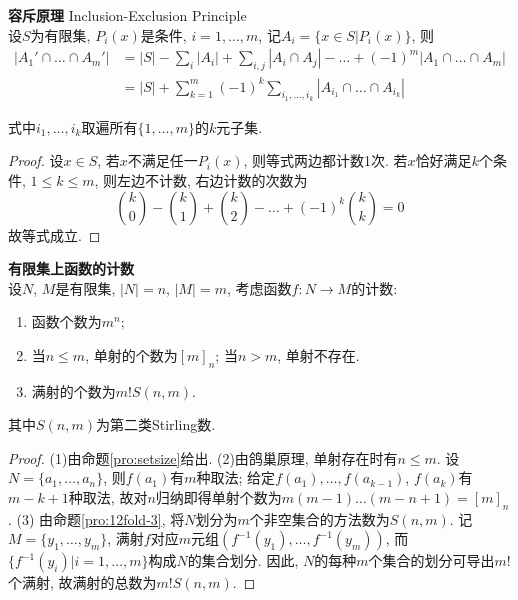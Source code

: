\begin{pro} \textbf{容斥原理} Inclusion-Exclusion Principle \\
设$S$为有限集, $P_i(x)$是条件, $i=1,\dots,m$, 记$A_i = \{x\in S\vert P_i(x)\}$, 则
\begin{align}
    |A_1' \cap \dots \cap A_m'|
    &=|S|-\sum_i |A_i|+\sum_{i,j} |A_i\cap A_j| -\dots+(-1)^m |A_1\cap\dots \cap A_m|\\
    &= |S|+\sum_{k=1}^m (-1)^k \sum_{i_1,\dots,i_k} |A_{i_1}\cap \dots \cap A_{i_k}|
\end{align}
\end{pro}
式中$i_1,\dots,i_k$取遍所有$\{1,\dots,m\}$的$k$元子集. 
\begin{proof}
设$x\in S$, 若$x$不满足任一$P_i(x)$, 则等式两边都计数1次. 若$x$恰好满足$k$个条件, $1\le k\le m$, 则左边不计数, 右边计数的次数为
\begin{equation}
    \binom{k}{0} - \binom{k}{1} + \binom{k}{2} - \dots + (-1)^k \binom{k}{k} = 0
\end{equation}
故等式成立. 
\end{proof}

\begin{pro}\textbf{有限集上函数的计数}\\
设$N$, $M$是有限集, $|N|=n$, $|M|=m$, 考虑函数$f:N\to M$的计数:
\begin{enumerate}
\item 函数个数为$m^n$;
\item 当$n\le m$, 单射的个数为$[m]_n$; 当$n>m$, 单射不存在. 
\item 满射的个数为$m!S(n,m)$.
\end{enumerate}
其中$S(n,m)$为第二类Stirling数. 
\label{pro:12fold-1}
\end{pro}
\begin{proof}
(1)由命题\ref{pro:setsize}给出. (2)由鸽巢原理, 单射存在时有$n\le m$. 设$N=\{a_1,\dots,a_n\}$, 则$f(a_1)$有$m$种取法; 给定$f(a_1),\dots, f(a_{k-1})$, $f(a_k)$有$m-k+1$种取法, 故对$n$归纳即得单射个数为$m(m-1)\dots(m-n+1)=[m]_n$. (3) 由命题\ref{pro:12fold-3}, 将$N$划分为$m$个非空集合的方法数为$S(n,m)$. 记$M=\{y_1,\dots,y_m\}$, 满射$f$对应$m$元组$(f^{-1}(y_1),\dots,f^{-1}(y_m))$, 而$\{f^{-1}(y_i)\vert i=1,\dots,m\}$构成$N$的集合划分. 因此, $N$的每种$m$个集合的划分可导出$m!$个满射, 故满射的总数为$m!S(n,m)$. 
\end{proof}

